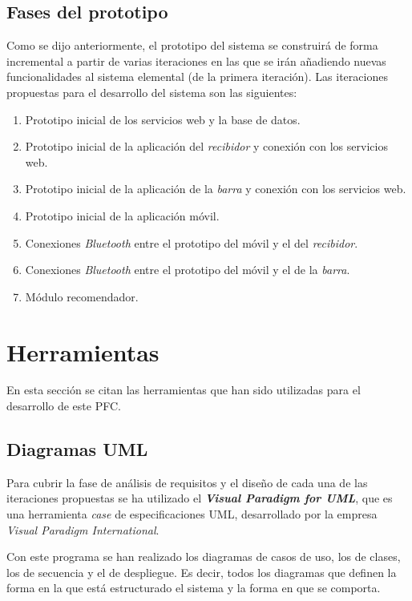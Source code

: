   \subsection{Fases del prototipo}
Como se dijo anteriormente, el prototipo del sistema se construirá de forma
incremental a partir de varias iteraciones en las que se irán añadiendo
nuevas funcionalidades al sistema elemental (de la primera iteración). Las
iteraciones propuestas para el desarrollo del sistema son las siguientes:
\begin{enumerate}
\item Prototipo inicial de los servicios web y la base de datos.
\item Prototipo inicial de la aplicación del \emph{recibidor} y conexión con 
los servicios web.
\item Prototipo inicial de la aplicación de la \emph{barra} y conexión con los 
servicios web.
\item Prototipo inicial de la aplicación móvil.
\item Conexiones \emph{Bluetooth} entre el prototipo del móvil y el del
\emph{recibidor}.
\item Conexiones \emph{Bluetooth} entre el prototipo del móvil y el de la
\emph{barra}.
\item Módulo recomendador.
\end{enumerate}

\section{Herramientas}
En esta sección se citan las herramientas que han sido utilizadas para el 
desarrollo de este \acs{PFC}.

  \subsection{Diagramas \acs{UML}}
  Para cubrir la fase de análisis de requisitos y el diseño de cada una de las
  iteraciones propuestas se ha utilizado el \emph{\textbf{Visual Paradigm
  for \acs{UML}}}, que es una herramienta \emph{case} de especificaciones
  \acs{UML}, desarrollado por la empresa \emph{Visual Paradigm International}.

  Con este programa se han realizado los diagramas de casos de uso, los de
  clases, los de secuencia y el de despliegue. Es decir,
  todos los diagramas que definen la forma en la que está estructurado el
  sistema y la forma en que se comporta.


